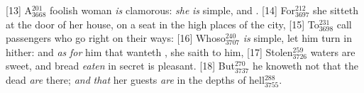 [13] \textcolor[cmyk]{0.99998,1,0,0}{A\textcolor{jungle}{$_{3668}^{201}$} foolish woman \emph{is} clamorous: \emph{she} \emph{is} simple, and .}
[14] \textcolor[cmyk]{0.99998,1,0,0}{For\textcolor{jungle}{$_{3697}^{212}$} she sitteth at the door of her house, on a seat in the high places of the city,}
[15] \textcolor[cmyk]{0.99998,1,0,0}{To\textcolor{jungle}{$_{3698}^{231}$} call passengers who go right on their ways:}
[16] \textcolor[cmyk]{0.99998,1,0,0}{Whoso\textcolor{jungle}{$_{3707}^{240}$} \emph{is} simple, let him turn in hither: and \emph{as} \emph{for} him that wanteth , she saith to him,}
[17] \textcolor[cmyk]{0.99998,1,0,0}{Stolen\textcolor{jungle}{$_{3726}^{259}$} waters are sweet, and bread \emph{eaten} in secret is pleasant.}
[18] \textcolor[cmyk]{0.99998,1,0,0}{But\textcolor{jungle}{$_{3737}^{270}$} he knoweth not that the dead \emph{are} there; \emph{and} \emph{that} her guests \emph{are} in the depths of hell\textcolor{jungle}{$_{3755}^{288}$}.}


